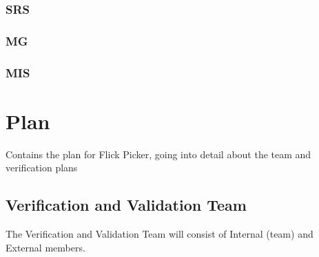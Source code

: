 \documentclass[12pt, titlepage]{article}
\begin{document}
\subsubsection{SRS}
\citet{SRS}

\subsubsection{MG}
\citet{MG}

\subsubsection{MIS}
\citet{MIS}

\section{Plan}

Contains the plan for Flick Picker, going into detail about the team and verification plans

\subsection{Verification and Validation Team}
The Verification and Validation Team will consist of Internal (team) and External members.
\end{document}
